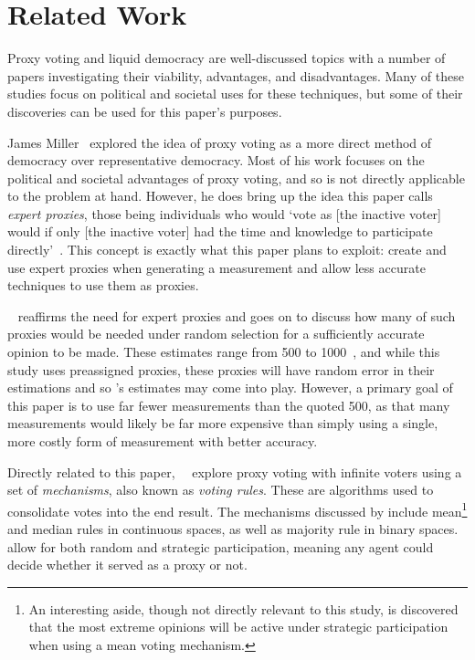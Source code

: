 \section{Related Work}\label{sec:related-work}
Proxy voting and liquid democracy are well-discussed topics with a number of
papers investigating their viability, advantages, and disadvantages.
Many of these studies focus on political and societal uses for these techniques,
but some of their discoveries can be used for this paper's purposes.

James Miller~\cite{Miller1969} explored the idea of proxy voting as a more
direct method of democracy over representative democracy.
Most of his work focuses on the political and societal advantages of proxy
voting, and so is not directly applicable to the problem at hand.
However, he does bring up the idea this paper calls \textit{expert proxies},
those being individuals who would `vote as [the inactive voter] would if only
[the inactive voter] had the time and knowledge to participate
directly'~\cite[para.~1.3]{Miller1969}.
This concept is exactly what this paper plans to exploit: create and use expert
proxies when generating a measurement and allow less accurate techniques to use
them as proxies.

~\cite{Mueller1972} reaffirms the need for expert proxies and
goes on to discuss how many of such proxies would be needed under random
selection for a sufficiently accurate opinion to be made.
These estimates range from 500 to 1000~\cite[para.~3.2]{Mueller1972}, and
while this study uses preassigned proxies, these proxies will have random
error in their estimations and so 's estimates may come into
play.
However, a primary goal of this paper is to use far fewer measurements than the
quoted 500, as that many measurements would likely be far more expensive than
simply using a single, more costly form of measurement with better accuracy.

Directly related to this paper,\ ~\cite{Cohensius2017} explore
proxy voting with infinite voters using a set of \textit{mechanisms}, also
known as \textit{voting rules}.
These are algorithms used to consolidate votes into the end result.
The mechanisms discussed by  include mean\footnote{An
interesting aside, though not directly relevant to this
study, is  discovered that the most extreme opinions will be
active under strategic participation when using a mean voting
mechanism\cite[lemma~9]{Cohensius2017}.}
and median rules in continuous spaces, as well as majority rule in
binary spaces.
 allow for both random and strategic participation, meaning any
agent could decide whether it served as a proxy or not.

